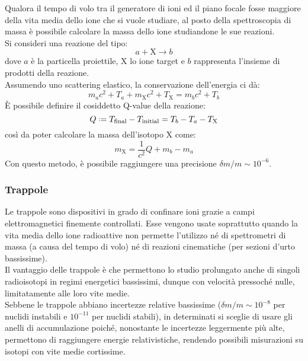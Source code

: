 Qualora il tempo di volo tra il generatore di ioni ed il piano focale fosse maggiore della vita media dello ione che si vuole studiare, al posto della spettroscopia di massa è possibile calcolare la massa dello ione studiandone le sue reazioni.\\
Si consideri una reazione del tipo:
\begin{equation}
	a + \text{X} \longrightarrow b
	\label{eq:1.19}
\end{equation}
dove $ a $ è la particella proiettile, $ \text{X} $ lo ione target e $ b $ rappresenta l'insieme di prodotti della reazione.\\
Assumendo uno scattering elastico, la conservazione dell'energia ci dà:
\begin{equation}
	m_a c^2 + T_a + m_{\text{X}} c^2 + T_{\text{X}} = m_b c^2 + T_b
	\label{eq:1.20}
\end{equation}
È possibile definire il cosiddetto Q-value della reazione:
\begin{equation}
	Q \defeq T_{\text{final}} - T_{\text{initial}} = T_b - T_a - T_{\text{X}}
	\label{eq:1.21}
\end{equation}
così da poter calcolare la massa dell'isotopo $ \text{X} $ come:
\begin{equation}
	m_{\text{X}} = \frac{1}{c^2} Q + m_b - m_a
	\label{eq:1.22}
\end{equation}
Con questo metodo, è possibile raggiungere una precisione $ \delta m / m \sim 10^{-6} $.

\subsubsection{Trappole}

Le trappole sono dispositivi in grado di confinare ioni grazie a campi elettromagnetici finemente controllati. Esse vengono usate soprattutto quando la vita media dello ione radioattive non permette l'utilizzo né di spettrometri di massa (a causa del tempo di volo) né di reazioni cinematiche (per sezioni d'urto bassissime).\\
Il vantaggio delle trappole è che permettono lo studio prolungato anche di singoli radioisotopi in regimi energetici bassissimi, dunque con velocità pressoché nulle, limitatamente alle loro vite medie.\\
Sebbene le trappole abbiano incertezze relative bassissime ($ \delta m / m \sim 10^{-8} $ per nuclidi instabili e $ 10^{-11} $ per nuclidi stabili), in determinati si sceglie di usare gli anelli di accumulazione poiché, nonostante le incertezze leggermente più alte, permettono di raggiungere energie relativistiche, rendendo possibili misurazioni su isotopi con vite medie cortissime.

